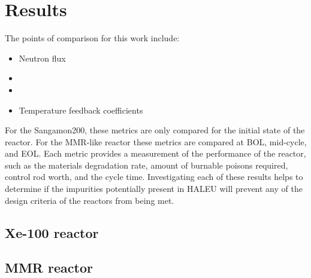 \section{Results}
The points of comparison for this work include:
\begin{itemize}
        \item Neutron flux 
        \item \keff 
        \item \betaEff
        \item Temperature feedback coefficients
\end{itemize}

For the Sangamon200, these metrics are only compared for the initial 
state of the reactor. For the \gls{MMR}-like reactor these metrics 
are compared at \gls{BOL}, mid-cycle, and \gls{EOL}. Each metric provides a 
measurement of the performance of 
the reactor, such as the materials degradation rate, amount of burnable 
poisons required, control rod worth, and the cycle time. Investigating 
each of these results helps to determine if the impurities potentially 
present in \gls{HALEU} will prevent any of the design criteria of the 
reactors from being met. 

\subsection{Xe-100 reactor}

\subsection{MMR reactor}